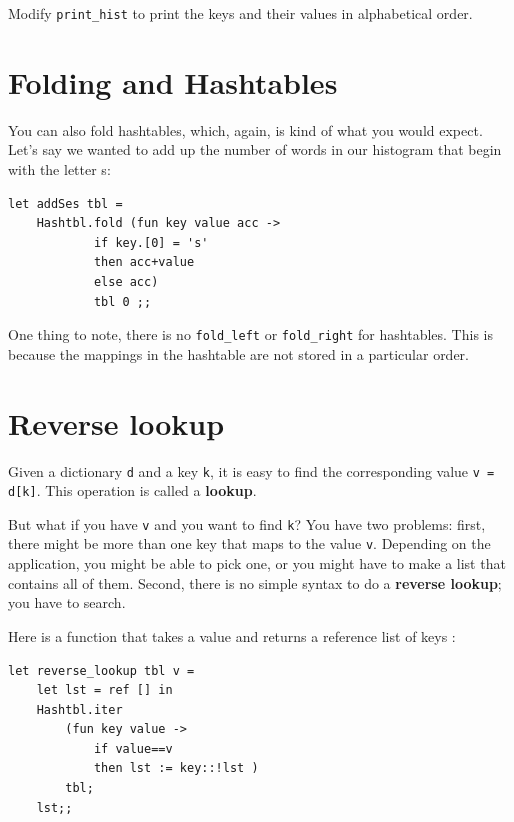 \documentclass[10pt]{book}
\begin{document}
{\begin{ex}

Modify \verb"print_hist" to print the keys and their values
in alphabetical order.

\end{ex}

\section{Folding and Hashtables}

You can also fold hashtables, which, again, is kind of what you
would expect. Let's say we wanted to add up the number of words 
in our histogram that begin with the letter s:

\beforeverb
\begin{verbatim}
let addSes tbl = 
	Hashtbl.fold (fun key value acc -> 
			if key.[0] = 's'
			then acc+value
			else acc)
			tbl 0 ;;
\end{verbatim}
\afterverb

One thing to note, there is no {\tt \verb"fold_left"} or {\tt \verb"fold_right"}
for hashtables. This is because the mappings in the hashtable are not stored in 
a particular order.

\section{Reverse lookup}


Given a dictionary {\tt d} and a key {\tt k}, it is easy to
find the corresponding value {\tt v = d[k]}.  This operation
is called a {\bf lookup}.

But what if you have {\tt v} and you want to find {\tt k}?
You have two problems: first, there might be more than one
key that maps to the value {\tt v}.  Depending on the application,
you might be able to pick one, or you might have to make
a list that contains all of them.  Second, there is no
simple syntax to do a {\bf reverse lookup}; you have to search.

Here is a function that takes a value and returns a reference list of 
keys :

\beforeverb
\begin{verbatim}
let reverse_lookup tbl v = 
	let lst = ref [] in
	Hashtbl.iter
		(fun key value ->
			if value==v
			then lst := key::!lst )
		tbl;
	lst;;
\end{verbatim}
\afterverb



}
\end{document}
